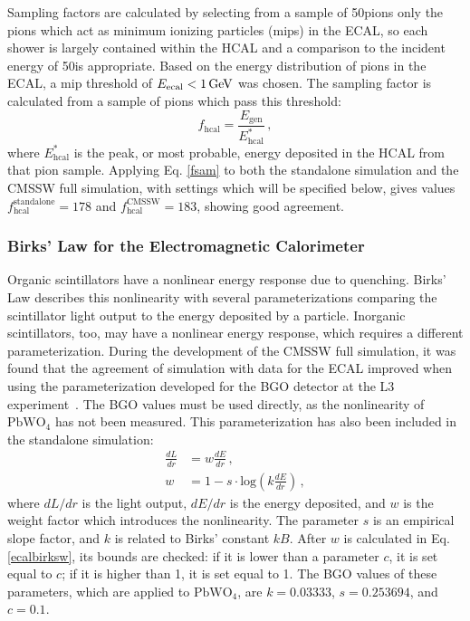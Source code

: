Sampling factors are calculated by selecting from a sample of 50\GeV pions only the pions which act as minimum ionizing particles (mips) in the ECAL, so each shower is largely contained within the HCAL and a comparison to the incident energy of 50\GeV is appropriate. Based on the energy distribution of pions in the ECAL, a mip threshold of $E_{\text{ecal}} < 1\,\text{Ge\hspace{-.08em}V}$ was chosen. The sampling factor is calculated from a sample of pions which pass this threshold:
\begin{equation} \label{fsam} f_{\text{hcal}} = \frac{E_{\text{gen}}}{E_{\text{hcal}}^{*}}\,, \end{equation}
where $E_{\text{hcal}}^{*}$ is the peak, or most probable, energy deposited in the HCAL from that pion sample. Applying Eq. \eqref{fsam} to both the standalone simulation and the CMSSW full simulation, with settings which will be specified below, gives values $f_{\text{hcal}}^{\text{standalone}} = 178$ and $f_{\text{hcal}}^{\text{CMSSW}} = 183$, showing good agreement.

\subsubsection{Birks' Law for the Electromagnetic Calorimeter}
\label{sec:newdetvalbirks}

Organic scintillators have a nonlinear energy response due to quenching. Birks' Law \cite{birks} describes this nonlinearity with several parameterizations comparing the scintillator light output to the energy deposited by a particle. Inorganic scintillators, too, may have a nonlinear energy response, which requires a different parameterization. During the development of the CMSSW full simulation, it was found that the agreement of simulation with data for the ECAL improved when using the parameterization developed for the BGO detector at the L3 experiment~\cite{datadriven}. The BGO values must be used directly, as the nonlinearity of $\text{PbWO}_{4}$ has not been measured. This parameterization has also been included in the standalone simulation:
\begin{align}
\label{ecalbirks} \frac{dL}{dr} &= w\frac{dE}{dr}\,, \\
\label{ecalbirksw} w &= 1 - s \cdot \text{log}\left(k\frac{dE}{dr}\right)\,,
\end{align}
where $dL/dr$ is the light output, $dE/dr$ is the energy deposited, and $w$ is the weight factor which introduces the nonlinearity. The parameter $s$ is an empirical slope factor, and $k$ is related to Birks' constant $kB$. After $w$ is calculated in Eq. \eqref{ecalbirksw}, its bounds are checked: if it is lower than a parameter $c$, it is set equal to $c$; if it is higher than 1, it is set equal to 1. The BGO values of these parameters, which are applied to $\text{PbWO}_{4}$, are $k = 0.03333$, $s = 0.253694$, and $c = 0.1$.

